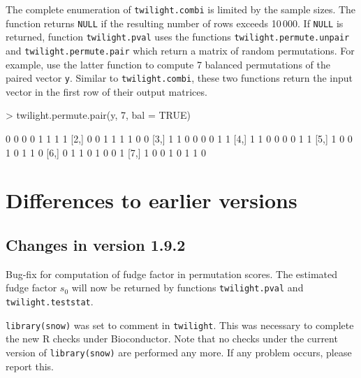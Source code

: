 \documentclass[11pt,a4paper,fleqn]{report}
\newcommand{\Rfunction}[1]{{\texttt{#1}}}
\newcommand{\Rfunarg}[1]{{\texttt{#1}}}
\begin{document}
The complete enumeration of \Rfunction{twilight.combi} is limited by the sample sizes. The function returns \Rfunarg{NULL} if the resulting number of rows exceeds 10\,000. If \Rfunarg{NULL} is returned, function \Rfunction{twilight.pval} uses the functions \Rfunction{twilight.permute.unpair} and \Rfunction{twilight.permute.pair} which return a matrix of random permutations. For example, use the latter function to compute 7 balanced permutations of the paired vector \Rfunarg{y}. Similar to \Rfunction{twilight.combi}, these two functions return the input vector in the first row of their output matrices.
\begin{Schunk}
\begin{Sinput}
> twilight.permute.pair(y, 7, bal = TRUE)
\end{Sinput}
\begin{Soutput}
     [,1] [,2] [,3] [,4] [,5] [,6] [,7] [,8]
[1,]    0    0    0    0    1    1    1    1
[2,]    0    0    1    1    1    1    0    0
[3,]    1    1    0    0    0    0    1    1
[4,]    1    1    0    0    0    0    1    1
[5,]    1    0    0    1    0    1    1    0
[6,]    0    1    1    0    1    0    0    1
[7,]    1    0    0    1    0    1    1    0
\end{Soutput}
\end{Schunk}




\chapter{Differences to earlier versions}


\section*{Changes in version 1.9.2}

Bug-fix for computation of fudge factor in permutation scores. The estimated fudge factor $s_0$ will now be returned by functions \Rfunction{twilight.pval} and \Rfunction{twilight.teststat}.

\Rfunction{library(snow)} was set to comment in \Rfunction{twilight}. This was necessary to complete the new R checks under Bioconductor. Note that no checks under the current version of \Rfunction{library(snow)} are performed any more. If any problem occurs, please report this.
\end{document}
